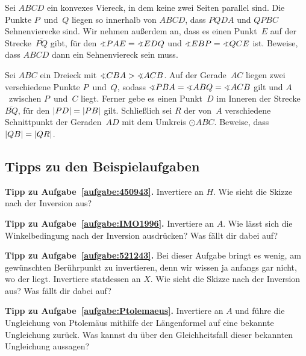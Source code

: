 \begin{aufgabe*}
	Sei $ABCD$ ein konvexes Viereck, in dem keine zwei Seiten parallel sind. Die Punkte $P$~und~$Q$ liegen so innerhalb von $ABCD$, dass $PQDA$ und $QPBC$ Sehnenvierecke sind. Wir nehmen außerdem an, dass es einen Punkt~$E$ auf der Strecke~$\overline{PQ}$ gibt, für den $\winkel PAE=\winkel EDQ$ und $\winkel EBP=\winkel QCE$ ist. Beweise, dass $ABCD$ dann ein Sehnenviereck sein muss.
\end{aufgabe*}

\begin{aufgabe*}[*]
	Sei $ABC$ ein Dreieck mit $\winkel CBA>\winkel ACB$. Auf der Gerade~$AC$ liegen zwei verschiedene Punkte $P$~und~$Q$, sodass $\winkel PBA=\winkel ABQ=\winkel ACB$ gilt und $A$~zwischen $P$~und~$C$ liegt. Ferner gebe es einen Punkt~$D$ im Inneren der Strecke $\overline{BQ}$, für den $\lvert PD\rvert=\lvert PB\rvert$ gilt. Schließlich sei $R$ der von~$A$ verschiedene Schnittpunkt der Geraden~$AD$ mit dem Umkreis $\odot ABC$. Beweise, dass $\lvert QB\rvert=\lvert QR\rvert$. 
\end{aufgabe*}

\subsection*{Tipps zu den Beispielaufgaben}
\textbf{Tipp zu Aufgabe~\ref{aufgabe:450943}.} Invertiere an $H$. Wie sieht die Skizze nach der Inversion aus?

\textbf{Tipp zu Aufgabe~\ref{aufgabe:IMO1996}.} Invertiere an $A$. Wie lässt sich die Winkelbedingung nach der Inversion ausdrücken? Was fällt dir dabei auf?

\textbf{Tipp zu Aufgabe~\ref{aufgabe:521243}.} Bei dieser Aufgabe bringt es wenig, am gewünschten Berührpunkt zu invertieren, denn wir wissen ja anfangs gar nicht, wo der liegt. Invertiere statdessen an $X$. Wie sieht die Skizze nach der Inversion aus? Was fällt dir dabei auf?

\textbf{Tipp zu Aufgabe~\ref{aufgabe:Ptolemaeus}.} Invertiere an $A$ und führe die Ungleichung von Ptolemäus mithilfe der Längenformel auf eine bekannte Ungleichung zurück. Was kannst du über den Gleichheitsfall dieser bekannten Ungleichung aussagen?